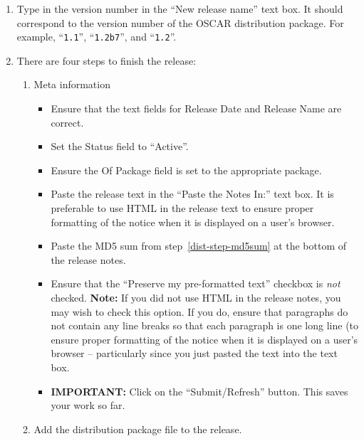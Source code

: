 \begin{enumerate}
\item Type in the version number in the ``New release name'' text
  box.  It should correspond to the version number of the OSCAR
  distribution package.  For example, ``{\tt 1.1}'', ``{\tt 1.2b7}'',
  and ``{\tt 1.2}''.

\item There are four steps to finish the release:

  \begin{enumerate}

    \item Meta information
      \begin{itemize}
      \item Ensure that the text fields for Release Date and Release
        Name are correct.
        
      \item Set the Status field to ``Active''.
        
      \item Ensure the Of Package field is set to the appropriate
        package.
        
      \item Paste the release text in the ``Paste the Notes In:'' text
        box.  It is preferable to use HTML in the release text to
        ensure proper formatting of the notice when it is displayed on
        a user's browser.
        
      \item Paste the MD5 sum from step~\ref{dist-step-md5sum} at the
        bottom of the release notes.

      \item Ensure that the ``Preserve my pre-formatted text''
        checkbox is {\em not} checked.  {\bf Note:} If you did not use
        HTML in the release notes, you may wish to check this option.
        If you do, ensure that paragraphs do not contain any line
        breaks so that each paragraph is one long line (to ensure
        proper formatting of the notice when it is displayed on a
        user's browser -- particularly since you just pasted the text
        into the text box.

      \item {\bf IMPORTANT:} Click on the ``Submit/Refresh'' button.
        This saves your work so far.
      \end{itemize}

  \item Add the distribution package file to the release.


\end{enumerate}
\end{enumerate}
